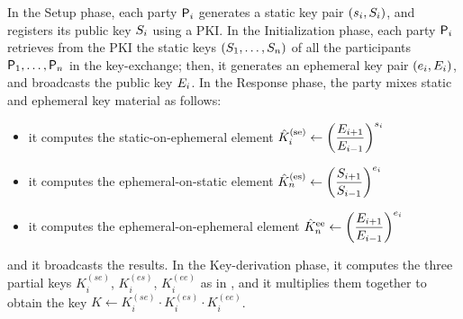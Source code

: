 In the Setup phase, each party $\User[i]$ generates a static key pair $(\ssk_i,\spk_i)$, and registers its public key $\spk_i$ using a PKI.
In the Initialization phase, each party $\User[i]$ retrieves from the PKI the static keys $(\spk_1,\dots,\spk_n)$ of all the participants $\User[1],\dots,\User[n]$  in the key-exchange; then, it generates an ephemeral key pair $(\esk_i,\epk_i)$, and broadcasts the public key $\epk_i$. 
In the Response phase, the party mixes static and ephemeral key material as follows:
\begin{itemize}
	\item it computes the static-on-ephemeral element $\hat{K}_i^\text{(se)} \gets \left( \dfrac{\epk_{i+1}}{\epk_{i-1}}\right)^{\ssk_i}$
	\item it computes the ephemeral-on-static element $\hat{K}_n^\text{(es)} \gets \left( \dfrac{\spk_{i+1}}{\spk_{i-1}}\right)^{\esk_i}$
	\item it computes the ephemeral-on-ephemeral element $\hat{K}_n^\text{ee} \gets \left( \dfrac{\epk_{i+1}}{\epk_{i-1}}\right)^{\esk_i}$ 
\end{itemize}
and it broadcasts the results.
In the Key-derivation phase, it computes the three partial keys $K_i^{(se)}$, $K_i^{(es)}$, $K_i^{(ee)}$ as in , and it multiplies them together to obtain the key $K \gets K_i^{(se)} \cdot K_i^{(es)} \cdot K_i^{(ee)}$.

